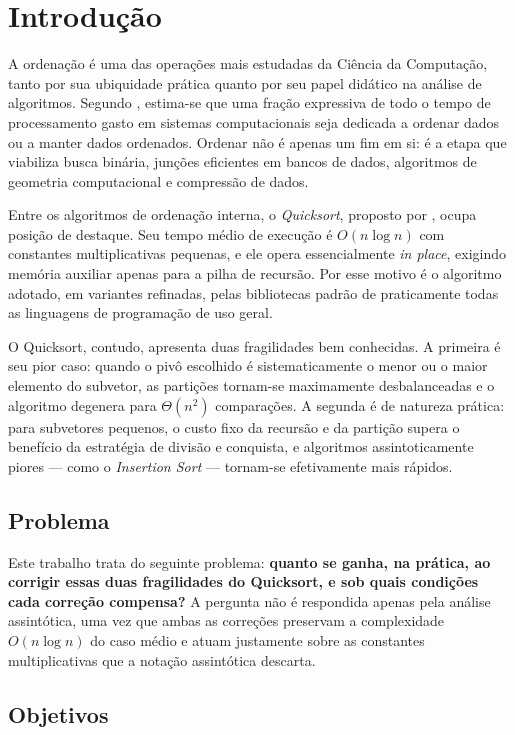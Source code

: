 \chapter{Introdução}
\label{cap:introducao}

A ordenação é uma das operações mais estudadas da Ciência da Computação, tanto por
sua ubiquidade prática quanto por seu papel didático na análise de algoritmos.
Segundo , estima-se que uma fração expressiva de todo o tempo
de processamento gasto em sistemas computacionais seja dedicada a ordenar dados ou
a manter dados ordenados. Ordenar não é apenas um fim em si: é a etapa que viabiliza
busca binária, junções eficientes em bancos de dados, algoritmos de geometria
computacional e compressão de dados.

Entre os algoritmos de ordenação interna, o \textit{Quicksort}, proposto por
, ocupa posição de destaque. Seu tempo médio de execução é
$O(n \log n)$ com constantes multiplicativas pequenas, e ele opera essencialmente
\textit{in place}, exigindo memória auxiliar apenas para a pilha de recursão.
Por esse motivo é o algoritmo adotado, em variantes refinadas, pelas bibliotecas
padrão de praticamente todas as linguagens de programação de uso geral.

O Quicksort, contudo, apresenta duas fragilidades bem conhecidas. A primeira é seu
pior caso: quando o pivô escolhido é sistematicamente o menor ou o maior elemento do
subvetor, as partições tornam-se maximamente desbalanceadas e o algoritmo degenera
para $\Theta(n^2)$ comparações. A segunda é de natureza prática: para subvetores
pequenos, o custo fixo da recursão e da partição supera o benefício da estratégia de
divisão e conquista, e algoritmos assintoticamente piores --- como o
\textit{Insertion Sort} --- tornam-se efetivamente mais rápidos.

\section{Problema}

Este trabalho trata do seguinte problema: \textbf{quanto se ganha, na prática, ao
corrigir essas duas fragilidades do Quicksort, e sob quais condições cada correção
compensa?} A pergunta não é respondida apenas pela análise assintótica, uma vez que
ambas as correções preservam a complexidade $O(n \log n)$ do caso médio e atuam
justamente sobre as constantes multiplicativas que a notação assintótica descarta.

\section{Objetivos}

